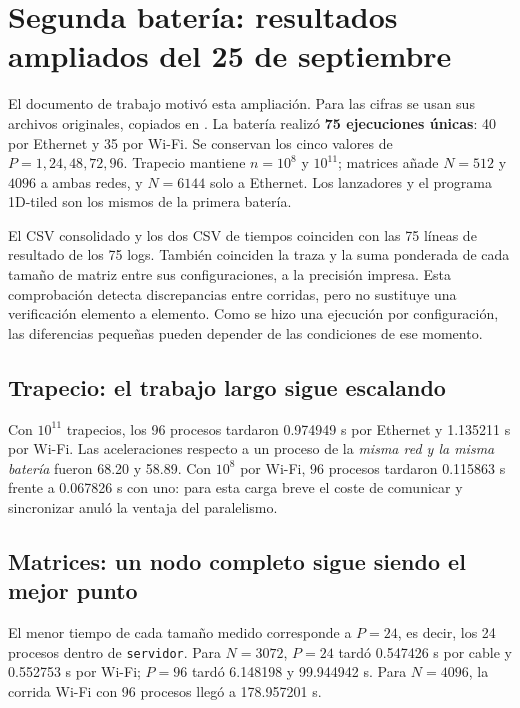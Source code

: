 \clearpage
\section{Segunda batería: resultados ampliados del 25 de septiembre}

El documento de trabajo  motivó esta ampliación. Para las cifras se usan sus archivos originales, copiados en . La batería realizó \textbf{75 ejecuciones únicas}: 40 por Ethernet y 35 por Wi-Fi. Se conservan los cinco valores de $P=1,24,48,72,96$. Trapecio mantiene $n=10^8$ y $10^{11}$; matrices añade $N=512$ y $4096$ a ambas redes, y $N=6144$ solo a Ethernet. Los lanzadores y el programa 1D-tiled son los mismos de la primera batería.

El CSV consolidado y los dos CSV de tiempos coinciden con las 75 líneas de resultado de los 75 logs. También coinciden la traza y la suma ponderada de cada tamaño de matriz entre sus configuraciones, a la precisión impresa. Esta comprobación detecta discrepancias entre corridas, pero no sustituye una verificación elemento a elemento. Como se hizo una ejecución por configuración, las diferencias pequeñas pueden depender de las condiciones de ese momento.

\subsection{Trapecio: el trabajo largo sigue escalando}


Con $10^{11}$ trapecios, los 96 procesos tardaron 0.974949 s por Ethernet y 1.135211 s por Wi-Fi. Las aceleraciones respecto a un proceso de la \emph{misma red y la misma batería} fueron 68.20 y 58.89. Con $10^8$ por Wi-Fi, 96 procesos tardaron 0.115863 s frente a 0.067826 s con uno: para esta carga breve el coste de comunicar y sincronizar anuló la ventaja del paralelismo.

\subsection{Matrices: un nodo completo sigue siendo el mejor punto}


El menor tiempo de cada tamaño medido corresponde a $P=24$, es decir, los 24 procesos dentro de \texttt{servidor}. Para $N=3072$, $P=24$ tardó 0.547426 s por cable y 0.552753 s por Wi-Fi; $P=96$ tardó 6.148198 y 99.944942 s. Para $N=4096$, la corrida Wi-Fi con 96 procesos llegó a 178.957201 s.

